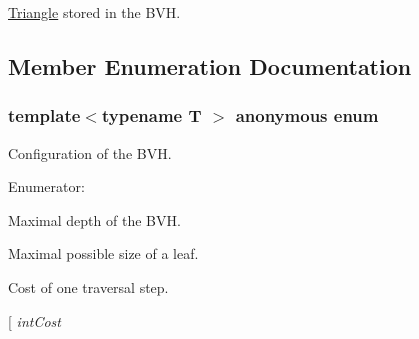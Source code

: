 \hyperlink{classembree_1_1_triangle}{Triangle} stored in the BVH. 



\subsection{Member Enumeration Documentation}
\hypertarget{classembree_1_1_b_v_h2_ad1f3bff28460ef5747a251ae58e103f6}{
\subsubsection[{"@5}]{\setlength{\rightskip}{0pt plus 5cm}template$<$typename T $>$ anonymous enum}}
\label{classembree_1_1_b_v_h2_ad1f3bff28460ef5747a251ae58e103f6}


Configuration of the BVH. 

\begin{Desc}
\item[Enumerator: ]\par
\begin{description}
\item[{\em 
\hypertarget{classembree_1_1_b_v_h2_ad1f3bff28460ef5747a251ae58e103f6a9b4c00a0b7f9b78ec7c4d2b7acaf816f}{
maxDepth}
\label{classembree_1_1_b_v_h2_ad1f3bff28460ef5747a251ae58e103f6a9b4c00a0b7f9b78ec7c4d2b7acaf816f}
}]Maximal depth of the BVH. \item[{\em 
\hypertarget{classembree_1_1_b_v_h2_ad1f3bff28460ef5747a251ae58e103f6a6d2e0b25a024c0f794bec3c21ee715a9}{
maxLeafSize}
\label{classembree_1_1_b_v_h2_ad1f3bff28460ef5747a251ae58e103f6a6d2e0b25a024c0f794bec3c21ee715a9}
}]Maximal possible size of a leaf. \item[{\em 
\hypertarget{classembree_1_1_b_v_h2_ad1f3bff28460ef5747a251ae58e103f6abc7a468da73de47cb3e79d527bb72381}{
travCost}
\label{classembree_1_1_b_v_h2_ad1f3bff28460ef5747a251ae58e103f6abc7a468da73de47cb3e79d527bb72381}
}]Cost of one traversal step. \item[{\em 
\hypertarget{classembree_1_1_b_v_h2_ad1f3bff28460ef5747a251ae58e103f6a75e3d2bc1e72635cb805bf1822b68630}{
intCost}
\label{classembree_1_1_b_v_h2_ad1f3bff28460ef5747a251ae58e103f6a75e3d2bc1e72635cb805bf1822b68630}
}
\end{description}
\end{Desc}
